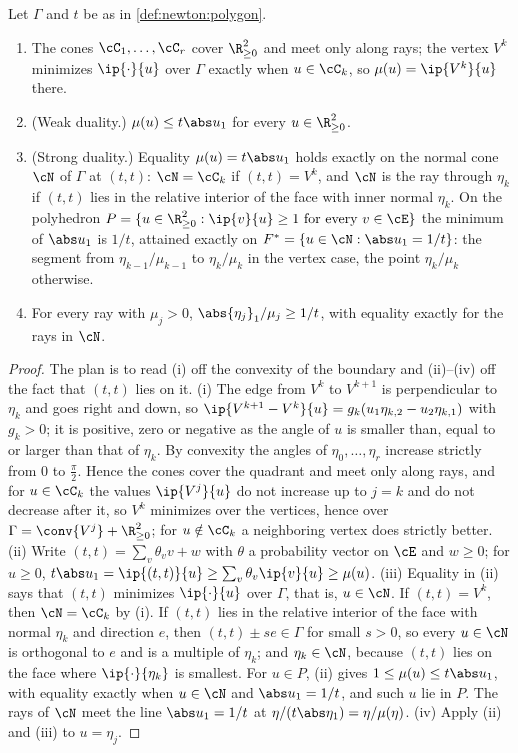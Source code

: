 \begin{refsection}
\begin{lemma}\label{lem:newton:lp}
Let $\Gamma$ and $t$ be as in \cref{def:newton:polygon}.
\begin{enumerate}
\item The cones $\cC_1,\dots,\cC_r$ cover $\R^2_{\ge0}$ and meet only along rays; the vertex $V^k$ minimizes $\ip{\cdot}{u}$ over $\Gamma$ exactly when $u\in\cC_k$, so $\mu(u)=\ip{V^k}{u}$ there.
\item (Weak duality.) $\mu(u)\le t\abs u_1$ for every $u\in\R^2_{\ge0}$.
\item (Strong duality.) Equality $\mu(u)=t\abs u_1$ holds exactly on the normal cone $\cN$ of $\Gamma$ at $(t,t)$: $\cN=\cC_k$ if $(t,t)=V^k$, and $\cN$ is the ray through $\eta_k$ if $(t,t)$ lies in the relative interior of the face with inner normal $\eta_k$. On the polyhedron $P=\{u\in\R^2_{\ge0}:\ip{v}{u}\ge1\text{ for every }v\in\cE\}$ the minimum of $\abs u_1$ is $1/t$, attained exactly on $F^*=\{u\in\cN:\abs u_1=1/t\}$: the segment from $\eta_{k-1}/\mu_{k-1}$ to $\eta_k/\mu_k$ in the vertex case, the point $\eta_k/\mu_k$ otherwise.
\item For every ray with $\mu_j>0$, $\abs{\eta_j}_1/\mu_j\ge1/t$, with equality exactly for the rays in $\cN$.
\end{enumerate}
\end{lemma}

\begin{proof}
The plan is to read (i) off the convexity of the boundary and (ii)--(iv) off the fact that $(t,t)$ lies on it. (i) The edge from $V^k$ to $V^{k+1}$ is perpendicular to $\eta_k$ and goes right and down, so $\ip{V^{k+1}-V^k}{u}=g_k(u_1\eta_{k,2}-u_2\eta_{k,1})$ with $g_k>0$; it is positive, zero or negative as the angle of $u$ is smaller than, equal to or larger than that of $\eta_k$. By convexity the angles of $\eta_0,\dots,\eta_r$ increase strictly from $0$ to $\frac\pi2$. Hence the cones cover the quadrant and meet only along rays, and for $u\in\cC_k$ the values $\ip{V^j}{u}$ do not increase up to $j=k$ and do not decrease after it, so $V^k$ minimizes over the vertices, hence over $\Gamma=\conv\{V^j\}+\R^2_{\ge0}$; for $u\notin\cC_k$ a neighboring vertex does strictly better. (ii) Write $(t,t)=\sum_v\theta_vv+w$ with $\theta$ a probability vector on $\cE$ and $w\ge0$; for $u\ge0$, $t\abs u_1=\ip{(t,t)}{u}\ge\sum_v\theta_v\ip{v}{u}\ge\mu(u)$. (iii) Equality in (ii) says that $(t,t)$ minimizes $\ip{\cdot}{u}$ over $\Gamma$, that is, $u\in\cN$. If $(t,t)=V^k$, then $\cN=\cC_k$ by (i). If $(t,t)$ lies in the relative interior of the face with normal $\eta_k$ and direction $e$, then $(t,t)\pm se\in\Gamma$ for small $s>0$, so every $u\in\cN$ is orthogonal to $e$ and is a multiple of $\eta_k$; and $\eta_k\in\cN$, because $(t,t)$ lies on the face where $\ip{\cdot}{\eta_k}$ is smallest. For $u\in P$, (ii) gives $1\le\mu(u)\le t\abs u_1$, with equality exactly when $u\in\cN$ and $\abs u_1=1/t$, and such $u$ lie in $P$. The rays of $\cN$ meet the line $\abs u_1=1/t$ at $\eta/(t\abs\eta_1)=\eta/\mu(\eta)$. (iv) Apply (ii) and (iii) to $u=\eta_j$.
\end{proof}


\end{refsection}
